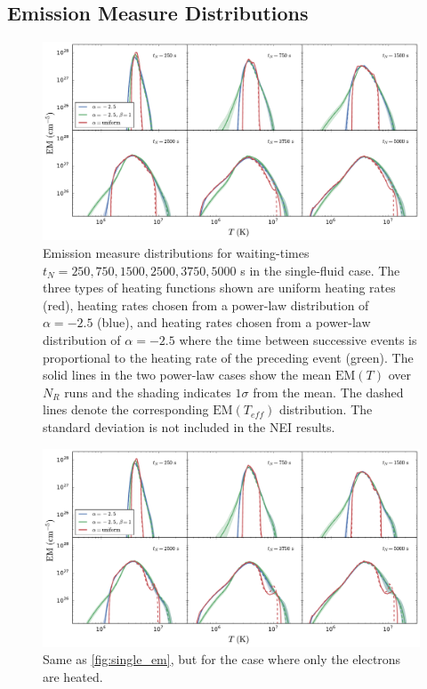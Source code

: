 \documentclass[apj]{emulateapj}
\begin{document}
	\subsection{Emission Measure Distributions}
	\label{subsec:em_dist}
	\begin{figure}[t]
		\centering
		\includegraphics[width=2\columnwidth]{figures/em_grid_single_a25.pdf}
		\caption{Emission measure distributions for waiting-times $t_N=250,750,1500,2500,3750,5000$ s in the single-fluid case. The three types of heating functions shown are uniform heating rates (red), heating rates chosen from a power-law distribution of $\alpha=-2.5$ (blue), and heating rates chosen from a power-law distribution of $\alpha=-2.5$ where the time between successive events is proportional to the heating rate of the preceding event (green). The solid lines in the two power-law cases show the mean $\mathrm{EM}(T)$ over $N_R$ runs and the shading indicates $1\sigma$ from the mean. The dashed lines denote the corresponding $\mathrm{EM}(T_{eff})$ distribution. The standard deviation is not included in the NEI results.}
		\label{fig:single_em}
	\end{figure}
	\begin{figure}[t]
		\centering
		\includegraphics[width=2\columnwidth]{figures/em_grid_electron_a25.pdf}
		\caption{Same as \autoref{fig:single_em}, but for the case where only the electrons are heated.}
		\label{fig:el_em}
	\end{figure}
\end{document}
